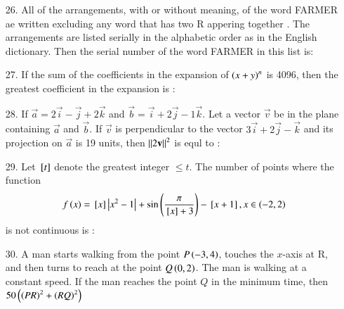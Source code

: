 \documentclass[journal,12pt,onecolumn]{IEEEtran}
\theoremstyle{remark}
\begin{document}
\begin{enumerate}
    \item[26.] All of the arrangements, with or without meaning, of the word FARMER ae written excluding any word that has two R appering together . The arrangements
        are listed serially in the alphabetic order as in the English dictionary. Then the serial number of the word FARMER in this list is:
        \hfill{}\\


    \item[27.] If the sum of the coefficients in the expansion of $\left(x + y\right)^n$ is 4096, then the greatest coefficient in the expansion is :
        \hfill{}\\


    \item[28.] If $\vec{a} = 2\vec{i} - \vec{j} + 2\vec{k}$ and $\vec{b} = \vec{i} + 2\vec{j} - 1\vec{k}$. Let a vector $\vec{v}$ be in the plane containing
        $\vec{a}$ and $\vec{b}$. If $\vec{v}$ is perpendicular to the vector $3\vec{i} + 2\vec{j} - \vec{k}$ and its projection on $\vec{a}$ is 19 units, 
        then $\left\lVert2\mathbf{v}\right\rVert^2$ is equl to :
        \hfill{}\\


    \item[29.] Let ${}\left[t\right]$ denote the greatest integer $ \le t $. The number of points where the function
        \begin{align}
            f\left(x\right) = {}\left[x\right] \left\vert x^2 - 1\right\vert + \sin \left(\frac{\pi}{{}\left[x\right] + 3}\right) - {}\left[x + 1\right], x \in \left(-2, 2\right) 
        \end{align}
        is not continuous is :
        \hfill{}\\


    \item[30.] A man starts walking from the point $P\left(-3,4\right)$, touches the $x$-axis at R, and then turns to reach at the point $Q\left(0, 2\right)$. The man is walking at a constant
        speed. If the man reaches the point $Q$ in the minimum time, then $50\left(\left(PR\right)^2 + \left(RQ\right)^2\right)$
        \hfill{}
        \begin{figure}
            \centering
        \end{figure}
\end{enumerate}
\end{document}
